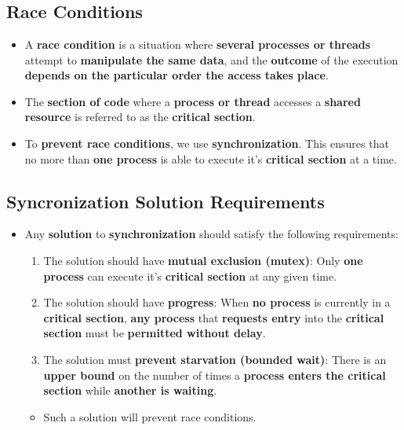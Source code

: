 \documentclass{article}
\begin{document}
\section*{}

\subsection*{Race Conditions}
\begin{itemize}
    \item A \textbf{race condition} is a situation where \textbf{several processes or threads} attempt to \textbf{manipulate the same data}, and the \textbf{outcome} of the execution \textbf{depends on the particular order the access takes place}.
    \item The \textbf{section of code} where a \textbf{process or thread} accesses a \textbf{shared resource} is referred to as the \textbf{critical section}.
    \item To \textbf{prevent race conditions}, we use \textbf{synchronization}. This ensures that no more than \textbf{one process} is able to execute it's \textbf{critical section} at a time.
\end{itemize}

\subsection*{Syncronization Solution Requirements}
\begin{itemize}
    \item Any \textbf{solution} to \textbf{synchronization} should satisfy the following requirements:
    \begin{enumerate}
        \item The solution should have \textbf{mutual exclusion (mutex)}: Only \textbf{one process} can execute it's \textbf{critical section} at any given time.
        \item The solution should have \textbf{progress}: When \textbf{no process} is currently in a \textbf{critical section}, \textbf{any process} that \textbf{requests entry} into the \textbf{critical section} must be \textbf{permitted without delay}.
        \item The solution must \textbf{prevent starvation (bounded wait)}: There is an \textbf{upper bound} on the number of times a \textbf{process enters the critical section} while \textbf{another is waiting}.
    \end{enumerate}
    \begin{itemize}
        \item Such a solution will prevent race conditions.
    \end{itemize}
\end{itemize}
\end{document}
